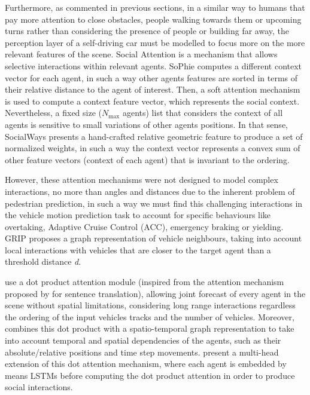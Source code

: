 Furthermore, as commented in previous sections, in a similar way to humans that pay more attention to close obstacles, people walking towards them or upcoming turns rather than considering the presence of people or building far away, the perception layer of a self-driving car must be modelled to focus more on the more relevant features of the scene. Social Attention is a mechanism that allows selective interactions within relevant agents. SoPhie \cite{sadeghian2019sophie} computes a different context vector for each agent, in such a way other agents features are sorted in terms of their relative distance to the agent of interest. Then, a soft attention mechanism is used to compute a context feature vector, which represents the social context. Nevertheless, a fixed size ($N_{\text{max}}$ agents) list that considers the context of all agents is sensitive to small variations \cite{mercat2020multi} of other agents positions. In that sense, SocialWays \cite{amirian2019social} presents a hand-crafted relative geometric feature to produce a set of normalized weights, in such a way the context vector represents a convex sum of other feature vectors (context of each agent) that is invariant to the ordering. 

However, these attention mechanisms were not designed to model complex interactions, no more than angles and distances due to the inherent problem of pedestrian prediction, in such a way we must find this challenging interactions in the vehicle motion prediction task to account for specific behaviours like overtaking, Adaptive Cruise Control (ACC), emergency braking or yielding. GRIP \cite{li2019grip} proposes a graph representation of vehicle neighbours, taking into account local interactions with vehicles that are closer to the target agent than a threshold distance \textit{d}.

\cite{vemula2018social} use a dot product attention module (inspired from the attention mechanism proposed by \cite{vaswani2017attention} for sentence translation), allowing joint forecast of every agent in the scene without spatial limitations, considering long range interactions regardless the ordering of the input vehicles tracks and the number of vehicles. Moreover, \cite{vemula2018social} combines this dot product with a spatio-temporal graph representation to take into account temporal and spatial dependencies of the agents, such as their absolute/relative positions and time step movements. \cite{mercat2020multi} present a multi-head extension of this dot attention mechanism, where each agent is embedded by means LSTMs before computing the dot product attention in order to produce social interactions. 

